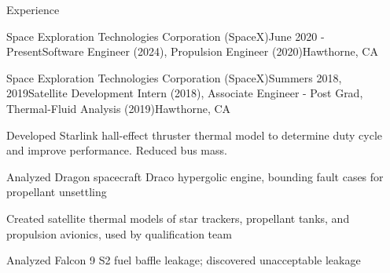 \documentclass{resume} %
\begin{document}
\begin{rSection}{Experience}
\begin{rSubsection}{{Space Exploration Technologies Corporation (SpaceX)}}{June 2020 - Present}{Software Engineer (2024), Propulsion Engineer (2020)}{Hawthorne, CA}
  \end{rSubsection}



  \begin{rSubsection}{Space Exploration Technologies Corporation (SpaceX)}{Summers 2018, 2019}{Satellite Development Intern (2018), Associate Engineer - Post Grad, Thermal-Fluid Analysis (2019)}{Hawthorne, CA}
	\item {\small Developed Starlink hall-effect thruster thermal model to determine duty cycle and improve performance. Reduced bus mass.}
	\item {\small Analyzed Dragon spacecraft Draco hypergolic engine, bounding fault cases for propellant unsettling}
	\item {\small Created satellite thermal models of star trackers, propellant tanks, and propulsion avionics, used by qualification team}
	\item {\small Analyzed Falcon 9 S2 fuel baffle leakage; discovered unacceptable leakage }
\end{rSubsection}



\end{rSection}
\end{document}
